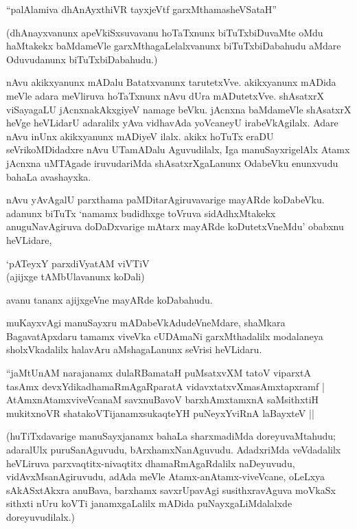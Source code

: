\begin{shloka}
``palAlamiva dhAnAyxthiVR tayxjeVtf garxMthamasheVSataH''
\end{shloka}

(dhAnayxvanunx apeVkiSxsuvavanu hoTaTxnunx biTuTxbiDuvaMte oMdu haMtakekx baMdameVle garxMthagaLelalxvanunx biTuTxbiDabahudu aMdare Oduvudanunx biTuTxbiDabahudu.)

nAvu akikxyanunx mADalu Batatxvanunx tarutetxVve. akikxyanunx mADida meVle adara meVliruva hoTaTxnunx nAvu dUra mADutetxVve. shAsatxrX viSayagaLU jAcnxnakAkxgiyeV namage beVku. jAcnxna baMdameVle shAsatxrX heVge heVLidarU adaralilx yAva vidhavAda yoVcaneyU irabeVkAgilalx. Adare nAvu inUnx akikxyanunx mADiyeV ilalx. akikx hoTuTx eraDU seVrikoMDidadxre nAvu UTamADalu Aguvudilalx, Iga manuSayxrigelAlx Atamx jAcnxna uMTAgade iruvudariMda shAsatxrXgaLanunx OdabeVku enunxvudu bahaLa avashayxka.

nAvu yAvAgalU parxthama paMDitarAgiruvavarige mayARde koDabeVku. adanunx biTuTx `namamx budidhxge toVruva sidAdhxMtakekx anuguNavAgiruva doDaDxvarige mAtarx mayARde koDutetxVneMdu' obabxnu heVLidare,

\begin{shloka}
`pATeyxY parxdiVyatAM viVTiV\\
(ajijxge tAMbUlavanunx koDali)
\end{shloka}

avanu tananx ajijxgeVne mayARde koDabahudu.

muKayxvAgi manuSayxru mADabeVkAdudeVneMdare, shaMkara BagavatApxdaru tamamx viveVka cUDAmaNi garxMthadalilx modalaneya sholxVkadalilx halavAru aMshagaLanunx seVrisi heVLidaru.

\begin{shloka}
``jaMtUnAM narajanamx dulaRBamataH puMsatxvXM tatoV viparxtA\\
tasAmx devxYdikadhamaRmAgaRparatA vidavxtatxvXmasAmxtapxramf |\\
AtAmxnAtamxviveVcanaM savxnuBavoV barxhAmxtamxnA saMsithxtiH\\
mukitxnoVR shatakoVTijanamxsukaqteYH puNeyxYviRnA laBayxteV ||
\end{shloka}

(huTiTxdavarige manuSayxjanamx bahaLa sharxmadiMda doreyuvaMtahudu; adaralUlx puruSanAguvudu, bArxhamxNanAguvudu. AdadxriMda veVdadalilx heVLiruva parxvaqtitx-nivaqtitx dhamaRmAgaRdalilx naDeyuvudu, vidAvxMsanAgiruvudu, adAda meVle Atamx-anAtamx-viveVcane, oLeLxya sAkASxtAkxra anuBava, barxhamx savxrUpavAgi susithxravAguva moVkaSx sithxti nUru koVTi janamxgaLalilx mADida puNayxgaLiMdalalxde doreyuvudilalx.)

